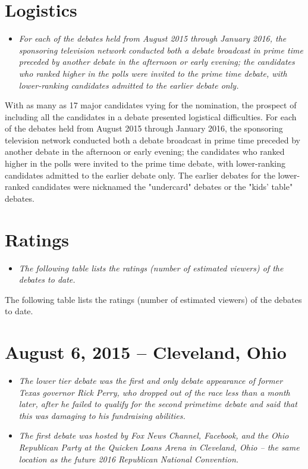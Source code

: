 \section{Logistics}\label{logistics}

\begin{itemize}
\item
  \emph{For each of the debates held from August 2015 through January
  2016, the sponsoring television network conducted both a debate
  broadcast in prime time preceded by another debate in the afternoon or
  early evening; the candidates who ranked higher in the polls were
  invited to the prime time debate, with lower-ranking candidates
  admitted to the earlier debate only.}
\end{itemize}

With as many as 17 major candidates vying for the nomination, the
prospect of including all the candidates in a debate presented
logistical difficulties. For each of the debates held from August 2015
through January 2016, the sponsoring television network conducted both a
debate broadcast in prime time preceded by another debate in the
afternoon or early evening; the candidates who ranked higher in the
polls were invited to the prime time debate, with lower-ranking
candidates admitted to the earlier debate only. The earlier debates for
the lower-ranked candidates were nicknamed the "undercard" debates or
the "kids' table" debates.

\section{Ratings}\label{ratings}

\begin{itemize}
\item
  \emph{The following table lists the ratings (number of estimated
  viewers) of the debates to date.}
\end{itemize}

The following table lists the ratings (number of estimated viewers) of
the debates to date.

\section{August 6, 2015 -- Cleveland,
Ohio}\label{august-6-2015-cleveland-ohio}

\begin{itemize}
\item
  \emph{The lower tier debate was the first and only debate appearance
  of former Texas governor Rick Perry, who dropped out of the race less
  than a month later, after he failed to qualify for the second
  primetime debate and said that this was damaging to his fundraising
  abilities.}
\item
  \emph{The first debate was hosted by Fox News Channel, Facebook, and
  the Ohio Republican Party at the Quicken Loans Arena in Cleveland,
  Ohio -- the same location as the future 2016 Republican National
  Convention.}
\end{itemize}

